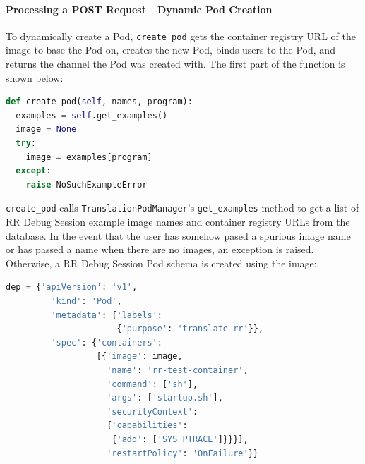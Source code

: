 \documentclass[12pt]{article}
\begin{document}


\paragraph{Processing a POST Request---Dynamic Pod Creation}

To dynamically create a Pod, \lstinline{create_pod} gets the container
registry URL of the image to base the Pod on, creates the new Pod,
binds users to the Pod, and returns the channel the Pod was created
with.  The first part of the function is shown below:\\

\begin{lstlisting}[language=Python,basicstyle=\linespread{0.5}\ttfamily\small,caption={Pod Creation 1},captionpos=b]
def create_pod(self, names, program):
  examples = self.get_examples()
  image = None
  try:
    image = examples[program]
  except:
    raise NoSuchExampleError
\end{lstlisting}

\lstinline{create_pod} calls \lstinline{TranslationPodManager}'s
\lstinline{get_examples} method to get a list of RR Debug Session
example image names and container registry URLs from the database.  In
the event that the user has somehow pased a spurious image name or has
passed a name when there are no images, an exception is raised.
Otherwise, a RR Debug Session Pod schema is created using the image:\\


\begin{lstlisting}[language=Python,basicstyle=\linespread{0.5}\ttfamily\small,caption={Pod Creation 2},captionpos=b]
  dep = {'apiVersion': 'v1',
         'kind': 'Pod',
         'metadata': {'labels':
                      {'purpose': 'translate-rr'}},
         'spec': {'containers':
                  [{'image': image,
                    'name': 'rr-test-container',
                    'command': ['sh'],
                    'args': ['startup.sh'],
                    'securityContext':
                    {'capabilities':
                     {'add': ['SYS_PTRACE']}}}],
                    'restartPolicy': 'OnFailure'}}
\end{lstlisting}
\end{document}
